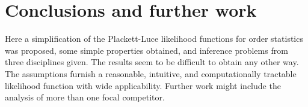\documentclass[sts]{imsart}
\begin{document}
\section{Conclusions and further work}

Here a simplification of the Plackett-Luce likelihood functions for
order statistics was proposed, some simple properties obtained, and
inference problems from three disciplines given.  The results seem to
be difficult to obtain any other way.  The assumptions furnish a
reasonable, intuitive, and computationally tractable likelihood
function with wide applicability.  Further work might include the
analysis of more than one focal competitor.



\begin{supplement}
\end{supplement}

\end{document}
